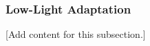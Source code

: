 
\subsubsection{Low-Light Adaptation}
\label{subsubsec:design_10_4_lowlight_adaptation}

[Add content for this subsection.]
